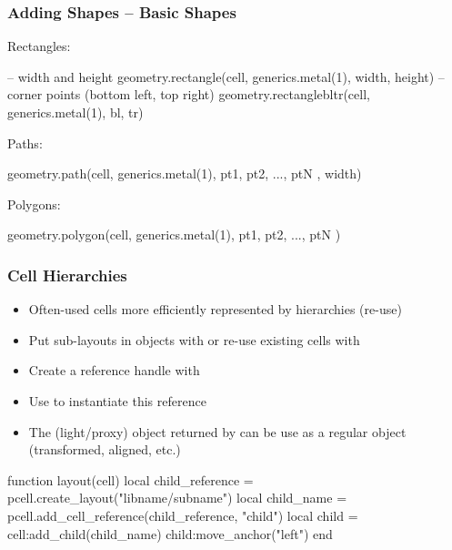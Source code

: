 \documentclass[aspectratio=169, dvipsnames, x11names, svgnames, 11pt]{beamer}
\begin{document}
\begin{frame}[fragile]
    \frametitle{Adding Shapes -- Basic Shapes}
    \centering
    \begin{minipage}{0.15\linewidth}Rectangles:\end{minipage} \hfill \begin{minipage}{0.80\linewidth}
    \begin{luacode}
        -- width and height
        geometry.rectangle(cell, generics.metal(1), 
            width, height)
        -- corner points (bottom left, top right)
        geometry.rectanglebltr(cell, generics.metal(1), 
            bl, tr)
    \end{luacode}\end{minipage}

    \begin{minipage}{0.15\linewidth}Paths:\end{minipage} \hfill \begin{minipage}{0.8\linewidth}
    \begin{luacode}
        geometry.path(cell, generics.metal(1),
            { pt1, pt2, ..., ptN }, width)
    \end{luacode}\end{minipage}

    \begin{minipage}{0.15\linewidth}Polygons:\end{minipage} \hfill \begin{minipage}{0.8\linewidth}
    \begin{luacode}
        geometry.polygon(cell, generics.metal(1),
            { pt1, pt2, ..., ptN })
    \end{luacode}\end{minipage}
\end{frame}

\begin{frame}[fragile]
    \frametitle{Cell Hierarchies}
    \centering
    \begin{itemize}
        \item Often-used cells more efficiently represented by hierarchies (re-use)
        \item Put sub-layouts in objects with  or re-use existing cells with 
        \item Create a reference handle with 
        \item Use  to instantiate this reference
        \item The (light/proxy) object returned by  can be use as a regular object (transformed, aligned, etc.)
    \end{itemize}
    \vfill
    \begin{luacode}
        function layout(cell)
            local child_reference = pcell.create_layout("libname/subname")
            local child_name = pcell.add_cell_reference(child_reference,
                "child")
            local child = cell:add_child(child_name)
            child:move_anchor("left")
        end
    \end{luacode}
\end{frame}
\end{document}

